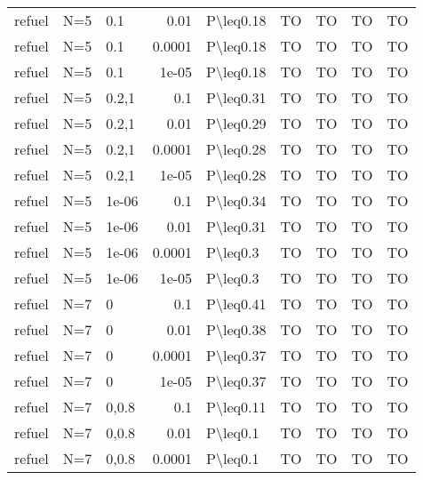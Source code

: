 \begin{longtable}{lllrlllll}
 refuel        & N=5       & 0.1   & 0.01   & P\textbackslash{}leq0.18  & TO   & TO   & TO       & TO      \\
 refuel        & N=5       & 0.1   & 0.0001 & P\textbackslash{}leq0.18  & TO   & TO   & TO       & TO      \\
 refuel        & N=5       & 0.1   & 1e-05  & P\textbackslash{}leq0.18  & TO   & TO   & TO       & TO      \\
 refuel        & N=5       & 0.2,1 & 0.1    & P\textbackslash{}leq0.31  & TO   & TO   & TO       & TO      \\
 refuel        & N=5       & 0.2,1 & 0.01   & P\textbackslash{}leq0.29  & TO   & TO   & TO       & TO      \\
 refuel        & N=5       & 0.2,1 & 0.0001 & P\textbackslash{}leq0.28  & TO   & TO   & TO       & TO      \\
 refuel        & N=5       & 0.2,1 & 1e-05  & P\textbackslash{}leq0.28  & TO   & TO   & TO       & TO      \\
 refuel        & N=5       & 1e-06 & 0.1    & P\textbackslash{}leq0.34  & TO   & TO   & TO       & TO      \\
 refuel        & N=5       & 1e-06 & 0.01   & P\textbackslash{}leq0.31  & TO   & TO   & TO       & TO      \\
 refuel        & N=5       & 1e-06 & 0.0001 & P\textbackslash{}leq0.3   & TO   & TO   & TO       & TO      \\
 refuel        & N=5       & 1e-06 & 1e-05  & P\textbackslash{}leq0.3   & TO   & TO   & TO       & TO      \\
 refuel        & N=7       & 0     & 0.1    & P\textbackslash{}leq0.41  & TO   & TO   & TO       & TO      \\
 refuel        & N=7       & 0     & 0.01   & P\textbackslash{}leq0.38  & TO   & TO   & TO       & TO      \\
 refuel        & N=7       & 0     & 0.0001 & P\textbackslash{}leq0.37  & TO   & TO   & TO       & TO      \\
 refuel        & N=7       & 0     & 1e-05  & P\textbackslash{}leq0.37  & TO   & TO   & TO       & TO      \\
 refuel        & N=7       & 0,0.8 & 0.1    & P\textbackslash{}leq0.11  & TO   & TO   & TO       & TO      \\
 refuel        & N=7       & 0,0.8 & 0.01   & P\textbackslash{}leq0.1   & TO   & TO   & TO       & TO      \\
 refuel        & N=7       & 0,0.8 & 0.0001 & P\textbackslash{}leq0.1   & TO   & TO   & TO       & TO      \\

\end{longtable}
